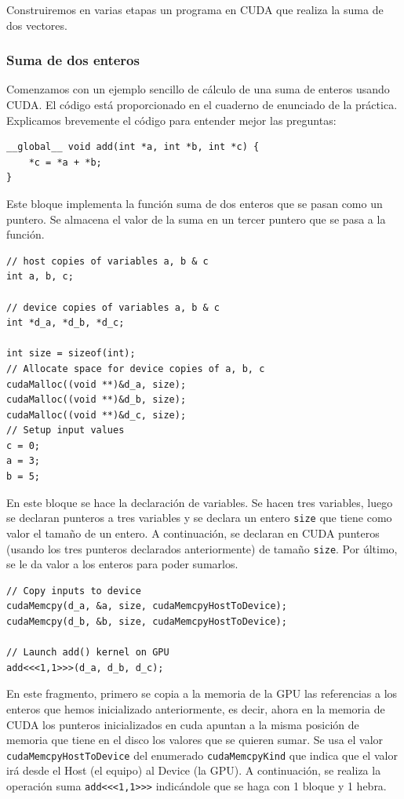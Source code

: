 \documentclass[11pt]{article}
\def\inline{\lstinline[basicstyle=\ttfamily,keywordstyle={}]}
\theoremstyle{plain}
\newcounter{enunciado}
\begin{document}
Construiremos en varias etapas un programa en CUDA que realiza la suma de dos vectores.

\subsubsection{Suma de dos enteros}

Comenzamos con un ejemplo sencillo de cálculo de una suma de enteros usando CUDA. El código está proporcionado en el cuaderno de enunciado de la práctica. Explicamos brevemente el código para entender mejor las preguntas:

\begin{verbatim}
__global__ void add(int *a, int *b, int *c) {
	*c = *a + *b;
}
\end{verbatim}
Este bloque implementa la función suma de dos enteros que se pasan como un puntero. Se almacena el valor de la suma en un tercer puntero que se pasa a la función.

\begin{verbatim}
// host copies of variables a, b & c
int a, b, c;

// device copies of variables a, b & c  
int *d_a, *d_b, *d_c;

int size = sizeof(int);
// Allocate space for device copies of a, b, c
cudaMalloc((void **)&d_a, size);
cudaMalloc((void **)&d_b, size);
cudaMalloc((void **)&d_c, size);
// Setup input values  
c = 0;
a = 3;
b = 5;
\end{verbatim}

En este bloque se hace la declaración de variables. Se hacen tres variables, luego se declaran punteros a tres variables y se declara un entero \inline{size} que tiene como valor el tamaño de un entero. A continuación, se declaran en CUDA punteros (usando los tres punteros declarados anteriormente) de tamaño \inline{size}. Por último, se le da valor a los enteros para poder sumarlos.

\begin{verbatim}
// Copy inputs to device
cudaMemcpy(d_a, &a, size, cudaMemcpyHostToDevice);
cudaMemcpy(d_b, &b, size, cudaMemcpyHostToDevice);

// Launch add() kernel on GPU
add<<<1,1>>>(d_a, d_b, d_c);  
\end{verbatim}

En este fragmento, primero se copia a la memoria de la GPU las referencias a los enteros que hemos inicializado anteriormente, es decir, ahora en la memoria de CUDA los punteros inicializados en cuda apuntan a la misma posición de memoria que tiene en el disco los valores que se quieren sumar. Se usa el valor \inline{cudaMemcpyHostToDevice} del enumerado \inline{cudaMemcpyKind} que indica que el valor irá desde el Host (el equipo) al Device (la GPU). A continuación, se realiza la operación suma \inline{add<<<1,1>>>} indicándole que se haga con 1 bloque y 1 hebra. 
\end{document}
